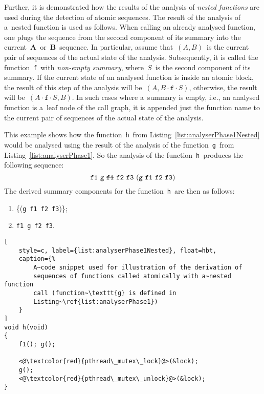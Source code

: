 \newpage
Further, it is demonstrated how the results of the analysis of \emph{nested
functions} are used during the detection of atomic sequences. The
result of the analysis of a~nested function is used as follows. When
calling an already analysed function, one plugs the sequence from the
second component of its summary into the
current~\textbf{A}~or~\textbf{B}~sequence. In particular, assume
that~$ (A, B) $~is the current pair of sequences of the actual state of
the analysis. Subsequently, it is called the function~\texttt{f}~with
\emph{non-empty summary}, where~$ S $~is the second component of its
summary. If the current state of an analysed function is inside an
atomic block, the result of this step of the analysis will
be~$ (A, B\cdot\mathtt{f}{\cdot}S) $, otherwise, the result will
be~$ (A\cdot\mathtt{f}{\cdot}S, B) $. In such cases where a~summary
is empty, i.e., an analysed function is a~leaf node of the call
graph, it is appended just the function name to the current pair of
sequences of the actual state of the analysis.

\begin{example}
    This example shows how the function~\texttt{h}~from
    Listing~\ref{list:analyserPhase1Nested} would be analysed using the
    result of the analysis of the function~\texttt{g}~from
    Listing~\ref{list:analyserPhase1}. So the analysis of the
    function~\texttt{h}~produces the following sequence:
    $$
        \text{%
            \texttt{f1}~\texttt{g}~\sout{\texttt{f1}}~\texttt{f2}~\texttt{f3}
        }
        (\text{%
            \texttt{g}~\texttt{f1}~\texttt{f2}~\texttt{f3}%
        })
    $$
    The derived summary components for the function~\texttt{h}~are then as
    follows:
    \begin{enumerate}[label={(\roman*)}]
        \item
            \{(\texttt{g}~\texttt{f1}~\texttt{f2}~\texttt{f3})\};

        \item
            \texttt{f1}~\texttt{g}~\texttt{f2}~\texttt{f3}.
    \end{enumerate}
\end{example}

\begin{lstlisting}[
    style=c, label={list:analyserPhase1Nested}, float=hbt,
    caption={%
        A~code snippet used for illustration of the derivation of
        sequences of functions called atomically with a~nested function
        call (function~\texttt{g} is defined in
        Listing~\ref{list:analyserPhase1})
    }
]
void h(void)
{
    f1(); g();

    <@\textcolor{red}{pthread\_mutex\_lock}@>(&lock);
    g();
    <@\textcolor{red}{pthread\_mutex\_unlock}@>(&lock);
}
\end{lstlisting}

